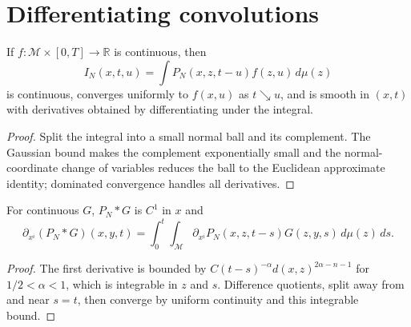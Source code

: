 \section{Differentiating convolutions}

\begin{lemma}
\label{lem:chow-iii-ch23-parametrix-integration-continuity}
If $f:\mathcal M\times[0,T]\to\mathbb R$ is continuous, then
\[
I_N(x,t,u)=\int P_N(x,z,t-u)f(z,u)\,d\mu(z)
\]
is continuous, converges uniformly to $f(x,u)$ as $t\searrow u$, and is smooth
in $(x,t)$ with derivatives obtained by differentiating under the integral.
\end{lemma}
\begin{proof}
\sketch Split the integral into a small normal ball and its complement.  The Gaussian
bound makes the complement exponentially small and the normal-coordinate change
of variables reduces the ball to the Euclidean approximate identity; dominated
convergence handles all derivatives.
\end{proof}

\begin{lemma}
\label{lem:chow-iii-ch23-first-convolution-derivative}
For continuous $G$, $P_N*G$ is $C^1$ in $x$ and
\[
\partial_{x^i}(P_N*G)(x,y,t)=\int_0^t\int_{\mathcal M}
\partial_{x^i}P_N(x,z,t-s)G(z,y,s)\,d\mu(z)\,ds.
\]
\end{lemma}
\begin{proof}
\sketch The first derivative is bounded by
\(C(t-s)^{-\alpha}d(x,z)^{2\alpha-n-1}\) for $1/2<\alpha<1$,
which is integrable in $z$ and $s$.  Difference quotients, split away from and
near $s=t$, then converge by uniform continuity and this integrable bound.
\end{proof}

